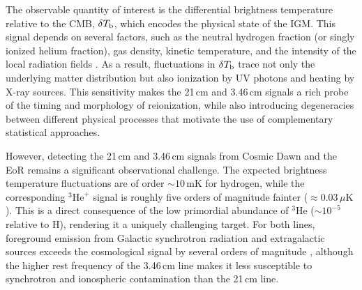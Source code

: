\documentclass[apj,twocolumn, appendixfloats, twocolappendix, numberedappendix, tighten]{openjournal}
\begin{document}



The observable quantity of interest is the differential brightness temperature relative to the CMB, $\delta T_{\rm b}$, which encodes the physical state of the IGM. This signal depends on several factors, such as the neutral hydrogen fraction (or singly ionized helium fraction), gas density, kinetic temperature, and the intensity of the  local radiation fields \citep[][]{Furlanetto2006, Pritchard2012}. As a result, fluctuations in $\delta T_{\rm b}$ trace not only the underlying matter distribution but also ionization by UV photons and heating by X-ray sources. This sensitivity makes the 21\,cm and 3.46\,cm signals a rich probe of the timing and morphology of reionization, while also introducing degeneracies between different physical processes that motivate the use of complementary statistical approaches.


However, detecting the 21\,cm and 3.46\,cm signals from Cosmic Dawn and the EoR remains a significant observational challenge. The expected brightness temperature fluctuations are of order $\sim 10\,\mathrm{mK}$ for hydrogen, while the corresponding $^{3}\text{He}^{+}$ signal is roughly five orders of magnitude fainter ($\approx 0.03\,\mu\mathrm{K}$). This is a direct consequence of the low primordial abundance of $^{3}\text{He}$ ($\sim 10^{-5}$ relative to H), rendering it a uniquely challenging target. For both lines, foreground emission from Galactic synchrotron radiation and extragalactic sources exceeds the cosmological signal by several orders of magnitude \citep{Dillon2014, Eastwood2019}, although the higher rest frequency of the 3.46\,cm line makes it less susceptible to synchrotron and ionospheric contamination than the 21\,cm line.
\end{document}
